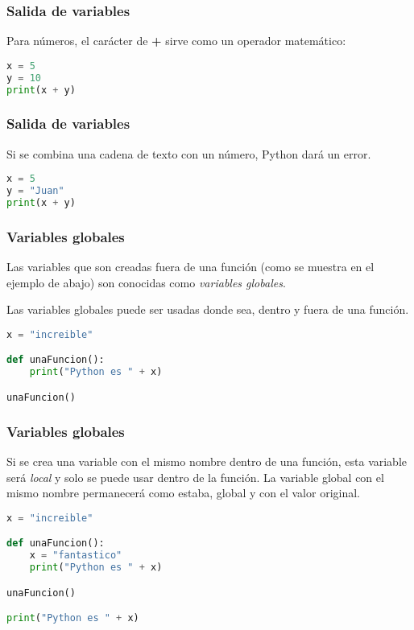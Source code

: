 \begin{frame}[fragile]
  \frametitle{Salida de variables}

  Para números, el carácter de \textbf{+} sirve como un
  operador matemático:

  \vspace{\baselineskip}
  \begin{lstlisting}[language=Python]
x = 5
y = 10
print(x + y)
  \end{lstlisting}
\end{frame}

\begin{frame}[fragile]
  \frametitle{Salida de variables}

  \begin{alertblock}{}
    Si se combina una cadena de texto con un número, Python dará un error.
  \end{alertblock}

  \vspace{\baselineskip}
  \begin{lstlisting}[language=Python]
x = 5
y = "Juan"
print(x + y)
  \end{lstlisting}
\end{frame}

\begin{frame}[fragile]
  \frametitle{Variables globales}

  Las variables que son creadas fuera de una función (como se muestra en el
  ejemplo de abajo) son conocidas como \emph{variables globales}.

  \vspace{\baselineskip}
  Las variables globales puede ser usadas donde sea, dentro y fuera de una
  función.

  \vspace{\baselineskip}
  \begin{lstlisting}[language=Python]
x = "increible"

def unaFuncion():
    print("Python es " + x)

unaFuncion()
  \end{lstlisting}
\end{frame}

\begin{frame}[fragile]
  \frametitle{Variables globales}

  Si se crea una variable con el mismo nombre dentro de una función,
  esta variable será \emph{local} y solo se puede usar dentro de la función.
  La variable global con el mismo nombre permanecerá como estaba, global y
  con el valor original.

  \vspace{\baselineskip}
  \begin{lstlisting}[language=Python]
x = "increible"

def unaFuncion():
    x = "fantastico"
    print("Python es " + x)

unaFuncion()

print("Python es " + x)
  \end{lstlisting}
\end{frame}

